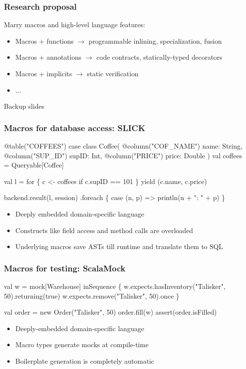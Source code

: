\documentclass[svgnames,hyperref={bookmarks=false}]{beamer}
\begin{document}
\begin{frame}[fragile]
\frametitle{Research proposal}

Marry macros and high-level language features:

\begin{itemize}
\item Macros + functions $\rightarrow$ programmable inlining, specialization, fusion
\item Macros + annotations $\rightarrow$ code contracts, statically-typed decorators
\item Macros + implicits $\rightarrow$ static verification
\item ...
\end{itemize}
\end{frame}

\begin{frame}[fragile]
\vskip50pt
\begin{center}
\large Backup slides
\end{center}
\end{frame}

\begin{frame}[fragile]
\frametitle{Macros for database access: SLICK}
\begin{semiverbatim}
@table("COFFEES") case class Coffee(
  @column("COF_NAME") name: String,
  @column("SUP_ID") supID: Int,
  @column("PRICE") price: Double
)
val coffees = Queryable[Coffee]

val l = for \{ c <- coffees if c.supID == 101 \}
yield (c.name, c.price)

backend.result(l, session)
 .foreach \{ case (n, p) => println(n + ": " + p) \}
\end{semiverbatim}

\begin{itemize}
\item Deeply embedded domain-specific language
\item Constructs like field access and method calls are overloaded
\item Underlying macros save ASTs till runtime and translate them to SQL
\end{itemize}
\end{frame}

\begin{frame}[fragile]
\frametitle{Macros for testing: ScalaMock}
\begin{semiverbatim}
val w = mock[Warehouse]
inSequence \{
  w.expects.hasInventory("Talisker", 50).returning(true)
  w.expects.remove("Talisker", 50).once
\}

val order = new Order("Talisker", 50)
order.fill(w)
assert(order.isFilled)

\end{semiverbatim}

\begin{itemize}
\item Deeply-embedded domain-specific language
\item Macro types generate mocks at compile-time
\item Boilerplate generation is completely automatic
\end{itemize}
\end{frame}
\end{document}
